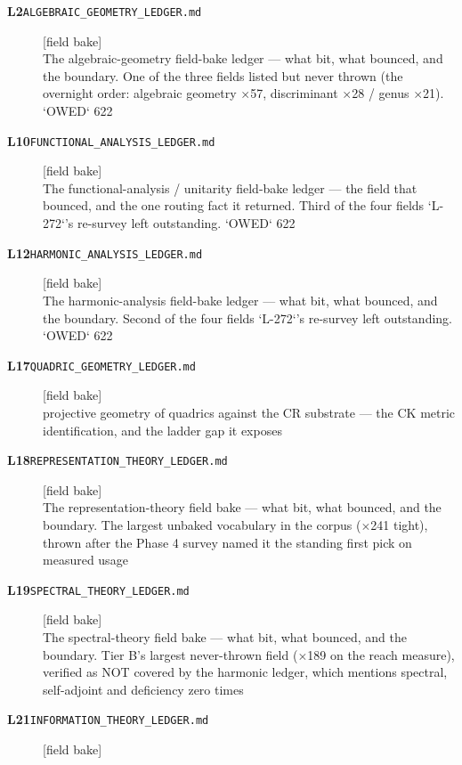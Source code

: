 \begin{description}
\item[\textbf{L2}\quad\texttt{ALGEBRAIC\_GEOMETRY\_LEDGER.md}]\hfill\textsf{[field bake]}\\
The algebraic-geometry field-bake ledger --- what bit, what bounced, and the boundary. One of the three fields listed but never thrown (the overnight order: algebraic geometry $\times$57, discriminant $\times$28 / genus $\times$21). `OWED` 622
\item[\textbf{L10}\quad\texttt{FUNCTIONAL\_ANALYSIS\_LEDGER.md}]\hfill\textsf{[field bake]}\\
The functional-analysis / unitarity field-bake ledger --- the field that bounced, and the one routing fact it returned. Third of the four fields `L-272`'s re-survey left outstanding. `OWED` 622
\item[\textbf{L12}\quad\texttt{HARMONIC\_ANALYSIS\_LEDGER.md}]\hfill\textsf{[field bake]}\\
The harmonic-analysis field-bake ledger --- what bit, what bounced, and the boundary. Second of the four fields `L-272`'s re-survey left outstanding. `OWED` 622
\item[\textbf{L17}\quad\texttt{QUADRIC\_GEOMETRY\_LEDGER.md}]\hfill\textsf{[field bake]}\\
projective geometry of quadrics against the CR substrate --- the CK metric identification, and the ladder gap it exposes
\item[\textbf{L18}\quad\texttt{REPRESENTATION\_THEORY\_LEDGER.md}]\hfill\textsf{[field bake]}\\
The representation-theory field bake --- what bit, what bounced, and the boundary. The largest unbaked vocabulary in the corpus ($\times$241 tight), thrown after the Phase 4 survey named it the standing first pick on measured usage
\item[\textbf{L19}\quad\texttt{SPECTRAL\_THEORY\_LEDGER.md}]\hfill\textsf{[field bake]}\\
The spectral-theory field bake --- what bit, what bounced, and the boundary. Tier B's largest never-thrown field ($\times$189 on the reach measure), verified as NOT covered by the harmonic ledger, which mentions spectral, self-adjoint and deficiency zero times
\item[\textbf{L21}\quad\texttt{INFORMATION\_THEORY\_LEDGER.md}]\hfill\textsf{[field bake]}\\

\end{description}
